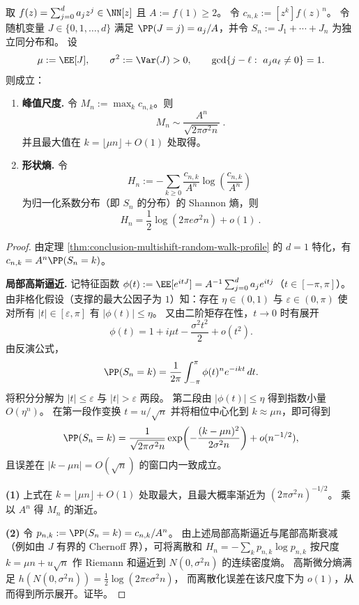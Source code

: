 \begin{theorem}\label{thm:conclusion-onedim-max-coefficient-entropy-profile}
取
\(
f(z)=\sum_{j=0}^{d}a_j z^j\in\NN[z]
\)
且 \(A:=f(1)\ge 2\)。
令
\(
c_{n,k}:=[z^k]f(z)^n
\)。
令随机变量 \(J\in\{0,1,\dots,d\}\) 满足 \(\PP(J=j)=a_j/A\)，并令
\(
S_n:=J_1+\cdots+J_n
\)
为独立同分布和。
设
\[
\mu:=\EE[J],\qquad \sigma^2:=\Var(J)>0,
\qquad
\gcd\{j-\ell:\ a_ja_\ell\neq 0\}=1.
\]
则成立：
\begin{enumerate}
  \item \textbf{峰值尺度.}
        令 \(M_n:=\max_{k}c_{n,k}\)。则
        \[
        \boxed{\ M_n\sim \frac{A^n}{\sqrt{2\pi\sigma^2 n}}\ }.
        \]
        并且最大值在 \(k=\lfloor \mu n\rfloor+O(1)\) 处取得。
  \item \textbf{形状熵.}
        令
        \[
        H_n:=-\sum_{k\ge 0}\frac{c_{n,k}}{A^n}\log\!\left(\frac{c_{n,k}}{A^n}\right)
        \]
        为归一化系数分布（即 \(S_n\) 的分布）的 Shannon 熵，则
        \[
        \boxed{\ H_n=\frac12\log(2\pi e\sigma^2 n)+o(1)\ }.
        \]
\end{enumerate}
\end{theorem}
\begin{proof}
由定理 \ref{thm:conclusion-multishift-random-walk-profile} 的 \(d=1\) 特化，有
\(
c_{n,k}=A^n\PP(S_n=k)
\)。
\par
\textbf{局部高斯逼近.}
记特征函数 \(\phi(t):=\EE[e^{itJ}]=A^{-1}\sum_{j=0}^d a_j e^{itj}\)（\(t\in[-\pi,\pi]\)）。
由非格化假设（支撑的最大公因子为 \(1\)）知：存在 \(\eta\in(0,1)\) 与 \(\varepsilon\in(0,\pi)\) 使对所有 \(|t|\in[\varepsilon,\pi]\) 有 \(|\phi(t)|\le \eta\)。
又由二阶矩存在性，\(t\to 0\) 时有展开
\[
\phi(t)=1+i\mu t-\frac{\sigma^2 t^2}{2}+o(t^2).
\]
由反演公式，
\[
\PP(S_n=k)=\frac{1}{2\pi}\int_{-\pi}^{\pi}\phi(t)^n e^{-ikt}\,dt.
\]
将积分分解为 \(|t|\le \varepsilon\) 与 \(|t|>\varepsilon\) 两段。
第二段由 \(|\phi(t)|\le\eta\) 得到指数小量 \(O(\eta^n)\)。
在第一段作变换 \(t=u/\sqrt n\) 并将相位中心化到 \(k\approx \mu n\)，即可得到
\[
\PP(S_n=k)=\frac{1}{\sqrt{2\pi\sigma^2 n}}
\exp\!\left(-\frac{(k-\mu n)^2}{2\sigma^2 n}\right)+o(n^{-1/2}),
\]
且误差在 \(|k-\mu n|=O(\sqrt n)\) 的窗口内一致成立。
\par
\textbf{(1)} 上式在 \(k=\lfloor\mu n\rfloor+O(1)\) 处取最大，且最大概率渐近为 \((2\pi\sigma^2 n)^{-1/2}\)。
乘以 \(A^n\) 得 \(M_n\) 的渐近。
\par
\textbf{(2)} 令 \(p_{n,k}:=\PP(S_n=k)=c_{n,k}/A^n\)。
由上述局部高斯逼近与尾部高斯衰减（例如由 \(J\) 有界的 Chernoff 界），可将离散和
\(
H_n=-\sum_k p_{n,k}\log p_{n,k}
\)
按尺度 \(k=\mu n+u\sqrt n\) 作 Riemann 和逼近到 \(N(0,\sigma^2 n)\) 的连续密度熵。
高斯微分熵满足
\(
h(N(0,\sigma^2 n))=\frac12\log(2\pi e\sigma^2 n)
\)，
而离散化误差在该尺度下为 \(o(1)\)，从而得到所示展开。证毕。
\end{proof}

\endinput
